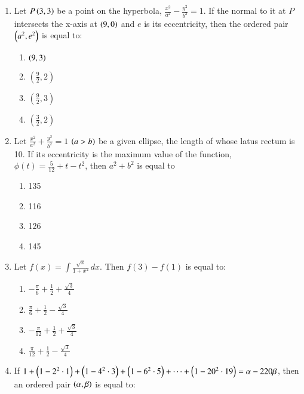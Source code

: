 \documentclass[journal,12pt,twocolumn]{IEEEtran}
\theoremstyle{remark}
\begin{document}
\begin{enumerate}
    \item Let $P\left(3,3\right)$ be a point on the hyperbola, $\frac{x^2}{a^2}-\frac{y^2}{b^2}=1$. If the normal to it at $P$ intersects the x-axis at $\left(9,0\right)$ and $e$ is its eccentricity, then the ordered pair $\left(a^2, e^2\right)$ is equal to:
\begin{multicols}{2}
\begin{enumerate}
    \item $\left(9,3\right)$
    \item $\left(\frac{9}{2},2\right)$
    \item $\left(\frac{9}{2},3\right)$
    \item $\left(\frac{3}{2},2\right)$
\end{enumerate}
\end{multicols}
\item Let $\frac{x^2}{a^2}+\frac{y^2}{b^2}=1$ $\left(a>b\right)$ be a given ellipse, the length of whose latus rectum is 10. If its eccentricity is the maximum value of the function, $\phi(t)=\frac{5}{12}+t-t^2$, then $a^2 + b^2$ is equal to
\begin{multicols}{2}
\begin{enumerate}
    \item 135
    \item 116
    \item 126
    \item 145
\end{enumerate}
\end{multicols}
\item Let $f(x)=\int\frac{\sqrt{x}}{1+x^2}\,dx$. Then $f(3)-f(1)$ is equal to:
\begin{multicols}{2}
\begin{enumerate}
    \item $-\frac{\pi}{6}+\frac{1}{2}+\frac{\sqrt{3}}{4}$
    \item $\frac{\pi}{6}+\frac{1}{2}-\frac{\sqrt{3}}{4}$
    \item $-\frac{\pi}{12}+\frac{1}{2}+\frac{\sqrt{3}}{4}$
    \item $\frac{\pi}{12}+\frac{1}{2}-\frac{\sqrt{3}}{4}$
\end{enumerate}
\end{multicols}
\item If $1+\left(1-2^2\cdot1\right)+\left(1-4^2\cdot3\right)+\left(1-6^2\cdot5\right)+\cdots+\left(1-20^2\cdot19\right)=\alpha-220\beta$, then an ordered pair $\left(\alpha,\beta\right)$ is equal to:
\begin{multicols}{2}
\begin{enumerate}

\end{enumerate}
\end{multicols}
\end{enumerate}
\end{document}
